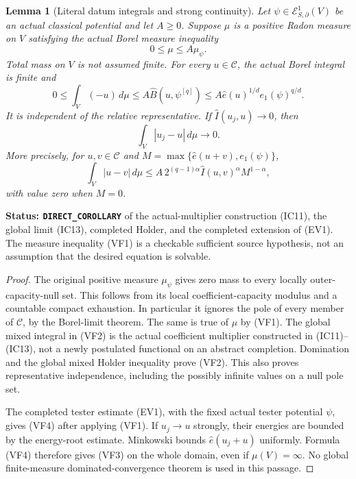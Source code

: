 \documentclass[11pt,a4paper]{article}
\numberwithin{equation}{section}
\newtheorem{lemma}[theorem]{Lemma}
\theoremstyle{definition}
\theoremstyle{remark}
\begin{document}
\begin{lemma}[Literal datum integrals and strong continuity]
\label{lem:r11-dominated-datum-strong-integration}
Let $\psi\in\mathcal E^1_{S,\partial}(V)$ be an actual
classical potential and let $A\geq0$.  Suppose $\mu$ is a
positive Radon measure on $V$ satisfying the actual Borel
measure inequality
\[
                              0\leq\mu\leq A\mu_\psi.
 \tag{VF1}
\]
Total mass on $V$ is not assumed finite.  For every $u\in\mathscr C$,
the actual Borel integral is finite and
\[
 0\leq\int_V(-u)\,d\mu
       \leq A\widehat B(u,\psi^{[q]})
       \leq A\widehat e(u)^{1/d}e_1(\psi)^{q/d}.
 \tag{VF2}
\]
It is independent of the relative representative.  If
$\widehat I(u_j,u)\to0$, then
\[
                         \int_V|u_j-u|\,d\mu\longrightarrow0.
 \tag{VF3}
\]
More precisely, for $u,v\in\mathscr C$ and
$M=\max\{\widehat e(u+v),e_1(\psi)\}$,
\[
 \int_V|u-v|\,d\mu
   \leq A\,2^{(q-1)\alpha}
                   \widehat I(u,v)^\alpha M^{1-\alpha},
 \tag{VF4}
\]
with value zero when $M=0$.
\end{lemma}

\noindent\textbf{Status: \texttt{DIRECT\_COROLLARY}} of
the actual-multiplier construction (IC11), the global limit
(IC13), completed Holder, and the completed extension of (EV1).
The measure inequality (VF1) is a checkable sufficient source
hypothesis, not an assumption that the desired equation is solvable.

\begin{proof}
The original positive measure $\mu_\psi$ gives zero mass to
every locally outer-capacity-null set.  This follows from its
local coefficient-capacity modulus and a countable compact
exhaustion.  In particular it ignores the pole of every member
of $\mathscr C$, by the Borel-limit theorem.  The same is true
of $\mu$ by (VF1).  The global mixed integral in (VF2) is the
actual coefficient multiplier constructed in (IC11)--(IC13),
not a newly postulated functional on an abstract completion.
Domination and the global mixed Holder inequality prove (VF2).
This also proves representative independence, including the
possibly infinite values on a null pole set.

The completed tester estimate (EV1), with the fixed actual
tester potential $\psi$, gives (VF4) after applying (VF1).
If $u_j\to u$ strongly, their energies are bounded by the
energy-root estimate.  Minkowski bounds $\widehat e(u_j+u)$
uniformly.  Formula (VF4) therefore gives (VF3) on the whole
domain, even if $\mu(V)=\infty$.  No global finite-measure
dominated-convergence theorem is used in this passage.
\end{proof}
\end{document}
